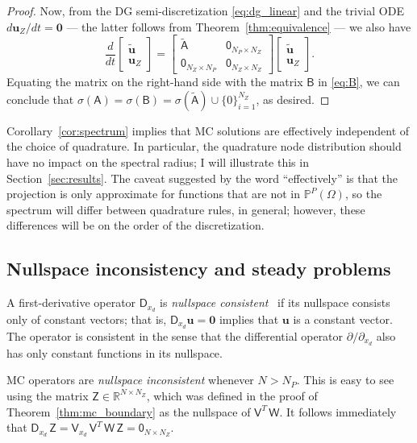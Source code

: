 \documentclass[pdflatex,sn-mathphys-num]{sn-jnl}%
\theoremstyle{thmstyleone}%
\theoremstyle{thmstyletwo}%
\theoremstyle{thmstylethree}%
\newcommand{\mat}[1]{\ensuremath{\mathsf{#1}}}
\begin{document}
\begin{proof}
Now, from the DG semi-discretization \eqref{eq:dg_linear} and the trivial ODE $d \bm{u}_Z/dt = \bm{0}$ --- the latter follows from Theorem~\ref{thm:equivalence} --- we also have 
\begin{equation*}
\frac{d}{dt} \begin{bmatrix} \tilde{\bm{u}} \\ \bm{u}_Z \end{bmatrix}
    = \begin{bmatrix} \tilde{\mat{A}} & \mat{0}_{N_P \times N_Z} \\[1.5ex] \mat{0}_{N_Z \times N_P} & \mat{0}_{N_Z \times N_Z} \end{bmatrix} \begin{bmatrix} \tilde{\bm{u}} \\ \bm{u}_Z \end{bmatrix}.
\end{equation*}
Equating the matrix on the right-hand side with the matrix $\mat{B}$ in \eqref{eq:B}, we can conclude that $\sigma(\mat{A}) = \sigma(\mat{B}) = \sigma(\tilde{\mat{A}}) \cup \{ 0 \}_{i=1}^{N_Z}$, as desired.
\end{proof}

Corollary~\ref{cor:spectrum} implies that MC solutions are effectively independent of the choice of quadrature.  In particular, the quadrature node distribution should have no impact on the spectral radius; I will illustrate this in Section~\ref{sec:results}.  The caveat suggested by the word ``effectively'' is that the projection is only approximate for functions that are not in $\mathbb{P}^{P}(\Omega)$, so the spectrum will differ between quadrature rules, in general; however, these differences will be on the order of the discretization.

\subsection{Nullspace inconsistency and steady problems}

A first-derivative operator $\mat{D}_{x_d}$ is \emph{nullspace consistent}~\cite{Svard2019convergence} if its nullspace consists only of constant vectors; that is, $\mat{D}_{x_d} \bm{u} = \bm{0}$ implies that $\bm{u}$ is a constant vector.  The operator is consistent in the sense that the differential operator $\partial/\partial_{x_d}$ also has only constant functions in its nullspace.

MC operators are \emph{nullspace inconsistent} whenever $N > N_P$.  This is easy to see using the matrix $\mat{Z} \in \mathbb{R}^{N \times N_Z}$, which was defined in the proof of Theorem~\ref{thm:mc_boundary} as the nullspace of $\mat{V}^T\, \mat{W}$.  It follows immediately that $\mat{D}_{x_d}\, \mat{Z} = \mat{V}_{x_d} \, \mat{V}^T \, \mat{W} \, \mat{Z} = \mat{0}_{N \times N_Z}$.
\end{document}
